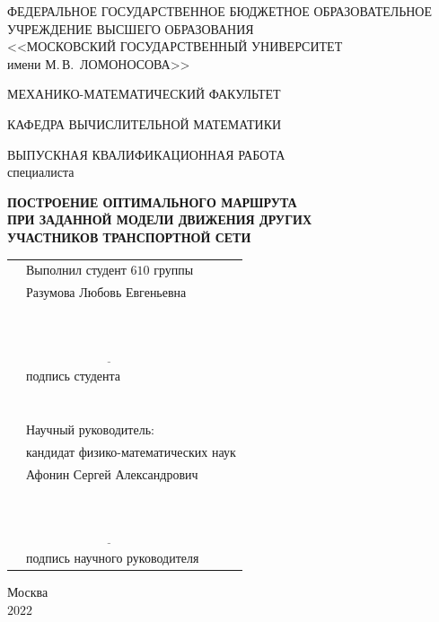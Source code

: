 \documentclass[12pt, a4paper]{article}
\begin{document}
	\pagestyle{empty}
	
	\begin{center}
		ФЕДЕРАЛЬНОЕ ГОСУДАРСТВЕННОЕ БЮДЖЕТНОЕ ОБРАЗОВАТЕЛЬНОЕ\\
		УЧРЕЖДЕНИЕ ВЫСШЕГО ОБРАЗОВАНИЯ\\
		<<МОСКОВСКИЙ ГОСУДАРСТВЕННЫЙ УНИВЕРСИТЕТ\\
		имени М.\,В.~ЛОМОНОСОВА>>
	\end{center}
	\vspace{4pt}
	\begin{center}
		МЕХАНИКО-МАТЕМАТИЧЕСКИЙ ФАКУЛЬТЕТ
	\end{center}
	\vspace{4pt}
	\begin{center}
		КАФЕДРА ВЫЧИСЛИТЕЛЬНОЙ МАТЕМАТИКИ
	\end{center}
	\vspace{1cm}
	\begin{center}
		ВЫПУСКНАЯ КВАЛИФИКАЦИОННАЯ РАБОТА\\
		специалиста
	\end{center}
	
	\begin{center}
		\textbf{ПОСТРОЕНИЕ ОПТИМАЛЬНОГО МАРШРУТА \\
			ПРИ ЗАДАННОЙ МОДЕЛИ ДВИЖЕНИЯ ДРУГИХ \\
			УЧАСТНИКОВ ТРАНСПОРТНОЙ СЕТИ}
	\end{center}
	\vspace{1cm}
	\begin{center}
		\begin{tabular}{p{9cm} l}
			& Выполнил студент $610$ группы\\
			& Разумова Любовь Евгеньевна\\
			& $\phantom{C_n^k=C_n^{n-k}}$\\
			& $\underline{\phantom{\int\limits_a^bf(x)dx=F(b)-F(a)}}$\\
			& подпись студента\\
			& $\phantom{\int\limits_f(z)dz=0}$\\
			& Научный руководитель:\\
			& кандидат физико-математических наук \\
			& Афонин Сергей Александрович\\
			& $\phantom{C_n^k=C_n^{n-k}}$\\
			& $\underline{\phantom{\int\limits_a^bf(x)dx=F(b)-F(a)}}$\\
			& подпись научного руководителя\\
		\end{tabular}
	\end{center}
	\vspace{1cm}
	\begin{center}
		Москва\\
		$2022$
	\end{center}
	
\end{document}
